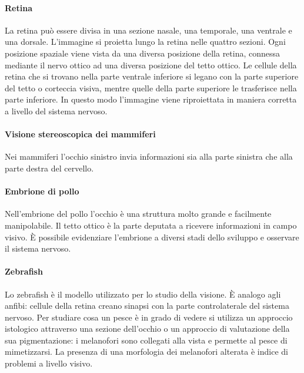 			\paragraph{Retina}
			La retina pu\`o essere divisa in una sezione nasale, una temporale, una ventrale e una dorsale.
			L'immagine si proietta lungo la retina nelle quattro sezioni.
			Ogni posizione spaziale viene vista da una diversa posizione della retina, connessa mediante il nervo ottico ad una diversa posizione del tetto ottico.
			Le cellule della retina che si trovano nella parte ventrale inferiore si legano con la parte superiore del tetto o corteccia visiva, mentre quelle della parte superiore le trasferisce nella parte inferiore.
			In questo modo l'immagine viene riproiettata in maniera corretta a livello del sistema nervoso.

			\paragraph{Visione stereoscopica dei mammiferi}
			Nei mammiferi l'occhio sinistro invia informazioni sia alla parte sinistra che alla parte destra del cervello.
		
			\paragraph{Embrione di pollo}
			Nell'embrione del pollo l'occhio \`e una struttura molto grande e facilmente manipolabile.
			Il tetto ottico \`e la parte deputata a ricevere informazioni in campo visivo.
			\`E possibile evidenziare l'embrione a diversi stadi dello sviluppo e osservare il sistema nervoso.
		
			\paragraph{Zebrafish}
			Lo zebrafish \`e il modello utilizzato per lo studio della visione.
			\`E analogo agli anfibi: cellule della retina creano sinapsi con la parte controlaterale del sistema nervoso.
			Per studiare cosa un pesce \`e in grado di vedere si utilizza un approccio istologico attraverso una sezione dell'occhio o un approccio di valutazione della sua pigmentazione: i melanofori sono collegati alla vista e permette al pesce di mimetizzarsi.
			La presenza di una morfologia dei melanofori alterata \`e indice di problemi a livello visivo.
	

